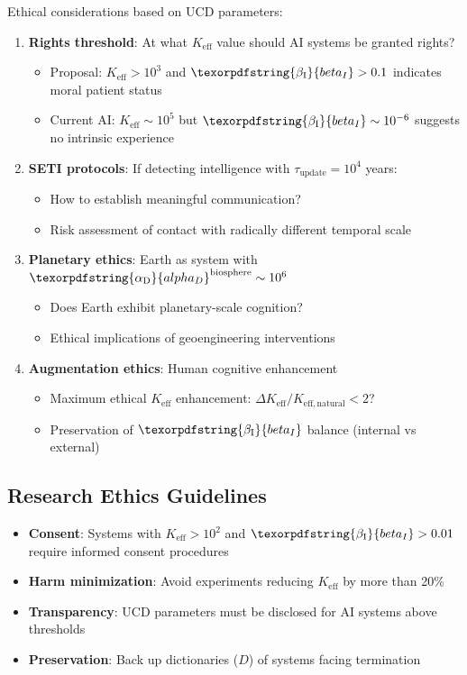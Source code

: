 \documentclass[12pt,a4paper]{article}
\DeclareRobustCommand{\alD}{\texorpdfstring{\ensuremath{\alpha_{\mathrm{D}}}}{alpha_D}}
\DeclareRobustCommand{\beI}{\texorpdfstring{\ensuremath{\beta_{\mathrm{I}}}}{beta_I}}
\newcommand{\eff}{\mathrm{eff}}
\newcommand{\Ke}{K_{\eff}}
\begin{document}
	Ethical considerations based on UCD parameters:
	\begin{enumerate}
		\item \textbf{Rights threshold}: At what \(\Ke\) value should AI systems be granted rights?
		\begin{itemize}
			\item Proposal: \(\Ke > 10^3\) and \(\beI > 0.1\) indicates moral patient status
			\item Current AI: \(\Ke \sim 10^5\) but \(\beI \sim 10^{-6}\) suggests no intrinsic experience
		\end{itemize}
		
		\item \textbf{SETI protocols}: If detecting intelligence with \(\tau_{\mathrm{update}} = 10^4\) years:
		\begin{itemize}
			\item How to establish meaningful communication?
			\item Risk assessment of contact with radically different temporal scale
		\end{itemize}
		
		\item \textbf{Planetary ethics}: Earth as system with \(\alD^{\mathrm{biosphere}} \sim 10^6\)
		\begin{itemize}
			\item Does Earth exhibit planetary-scale cognition?
			\item Ethical implications of geoengineering interventions
		\end{itemize}
		
		\item \textbf{Augmentation ethics}: Human cognitive enhancement
		\begin{itemize}
			\item Maximum ethical \(\Ke\) enhancement: \(\Delta\Ke/K_{\eff,\mathrm{natural}} < 2\)?
			\item Preservation of \(\beI\) balance (internal vs external)
		\end{itemize}
	\end{enumerate}
	
	\subsection{Research Ethics Guidelines}
	
	\begin{itemize}
		\item \textbf{Consent}: Systems with \(\Ke > 10^2\) and \(\beI > 0.01\) require informed consent procedures
		\item \textbf{Harm minimization}: Avoid experiments reducing \(\Ke\) by more than 20\%
		\item \textbf{Transparency}: UCD parameters must be disclosed for AI systems above thresholds
		\item \textbf{Preservation}: Back up dictionaries (\(D\)) of systems facing termination
	\end{itemize}
	
\end{document}
